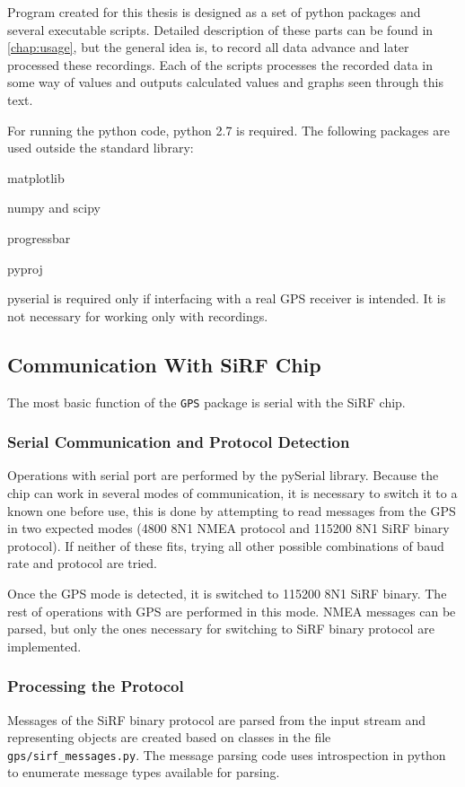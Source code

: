 Program created for this thesis is designed as a set of python packages and
several executable scripts.
Detailed description of these parts can be found in \cref{chap:usage},
but the general idea is, to record all data advance and later processed these
recordings.
Each of the scripts processes the recorded data in some way of values and
outputs calculated values and graphs seen through this text.

For running the python code, python 2.7 is required.
The following packages are used outside the standard library:
\begin{compactitem}
\item matplotlib
\item numpy and scipy
\item progressbar
\item pyproj
\item pyserial is required only if interfacing with a real
    GPS receiver is intended. It is not necessary for working only with recordings.
\end{compactitem}

\subsection{Communication With SiRF Chip}
The most basic function of the \verb=GPS= package is serial with the
SiRF chip.

\subsubsection{Serial Communication and Protocol Detection}
Operations with serial port are performed by the pySerial library.
Because the chip can work in several modes of communication, it is necessary to
switch it to a known one before use, this is done by attempting to read messages
from the GPS in two expected modes (4800 8N1 NMEA protocol and 115200 8N1 SiRF
binary protocol). If neither of these fits, trying all other possible
combinations of baud rate and protocol are tried.

Once the GPS mode is detected, it is switched to 115200 8N1 SiRF binary.
The rest of operations with GPS are performed in this mode.
NMEA messages can be parsed, but only the ones necessary for switching to
SiRF binary protocol are implemented.

\subsubsection{Processing the Protocol}
Messages of the SiRF binary protocol are parsed from the input stream and
representing objects are created based on classes in the file \verb=gps/sirf_messages.py=.
The message parsing code uses introspection in python to enumerate message types
available for parsing.

